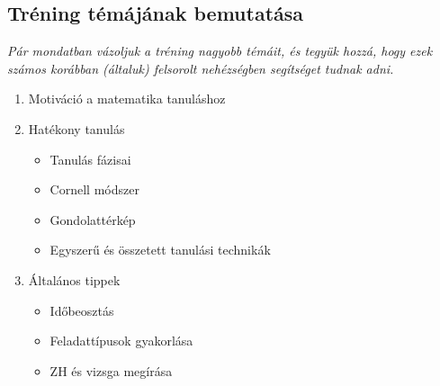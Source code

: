 \documentclass[../Main.tex]{subfiles}
\begin{document}
\subsection{Tréning témájának bemutatása}

\textit{Pár mondatban vázoljuk a tréning nagyobb témáit, és tegyük hozzá, hogy ezek számos korábban (általuk)
felsorolt nehézségben segítséget tudnak adni.}

\begin{multicols}{2}
\begin{enumerate}
    \item Motiváció a matematika tanuláshoz
    \item Hatékony tanulás
    \begin{itemize}
        \item Tanulás fázisai
        \item Cornell módszer
        \item Gondolattérkép
        \item Egyszerű és összetett tanulási technikák
    \end{itemize}

    \columnbreak

    \item Általános tippek
    \begin{itemize}
        \item Időbeosztás
        \item Feladattípusok gyakorlása
        \item ZH és vizsga megírása
    \end{itemize}
\end{enumerate}
\end{multicols}
\end{document}
